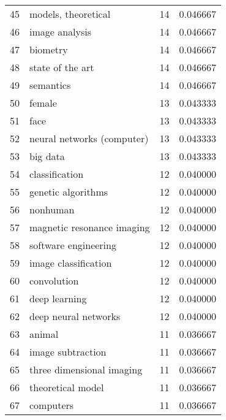 \begin{tabular}{llrr}
45 &                      models, theoretical &          14 &    0.046667 \\
46 &                           image analysis &          14 &    0.046667 \\
47 &                                 biometry &          14 &    0.046667 \\
48 &                         state of the art &          14 &    0.046667 \\
49 &                                semantics &          14 &    0.046667 \\
50 &                                   female &          13 &    0.043333 \\
51 &                                     face &          13 &    0.043333 \\
52 &               neural networks (computer) &          13 &    0.043333 \\
53 &                                 big data &          13 &    0.043333 \\
54 &                           classification &          12 &    0.040000 \\
55 &                       genetic algorithms &          12 &    0.040000 \\
56 &                                 nonhuman &          12 &    0.040000 \\
57 &               magnetic resonance imaging &          12 &    0.040000 \\
58 &                     software engineering &          12 &    0.040000 \\
59 &                     image classification &          12 &    0.040000 \\
60 &                              convolution &          12 &    0.040000 \\
61 &                            deep learning &          12 &    0.040000 \\
62 &                     deep neural networks &          12 &    0.040000 \\
63 &                                   animal &          11 &    0.036667 \\
64 &                        image subtraction &          11 &    0.036667 \\
65 &                three dimensional imaging &          11 &    0.036667 \\
66 &                        theoretical model &          11 &    0.036667 \\
67 &                                computers &          11 &    0.036667 \\

\end{tabular}
